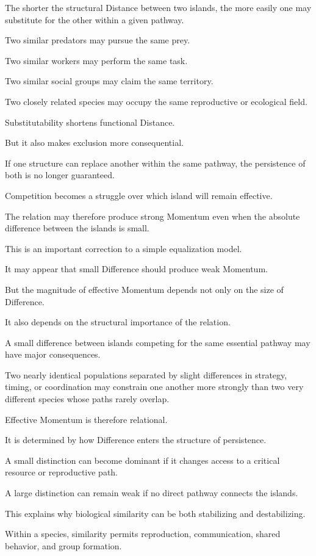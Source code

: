 The shorter the structural Distance between two islands, the more easily one may substitute for the other within a given pathway.

Two similar predators may pursue the same prey.

Two similar workers may perform the same task.

Two similar social groups may claim the same territory.

Two closely related species may occupy the same reproductive or ecological field.

Substitutability shortens functional Distance.

But it also makes exclusion more consequential.

If one structure can replace another within the same pathway, the persistence of both is no longer guaranteed.

Competition becomes a struggle over which island will remain effective.

The relation may therefore produce strong Momentum even when the absolute difference between the islands is small.

This is an important correction to a simple equalization model.

It may appear that small Difference should produce weak Momentum.

But the magnitude of effective Momentum depends not only on the size of Difference.

It also depends on the structural importance of the relation.

A small difference between islands competing for the same essential pathway may have major consequences.

Two nearly identical populations separated by slight differences in strategy, timing, or coordination may constrain one another more strongly than two very different species whose paths rarely overlap.

Effective Momentum is therefore relational.

It is determined by how Difference enters the structure of persistence.

A small distinction can become dominant if it changes access to a critical resource or reproductive path.

A large distinction can remain weak if no direct pathway connects the islands.

This explains why biological similarity can be both stabilizing and destabilizing.

Within a species, similarity permits reproduction, communication, shared behavior, and group formation.

